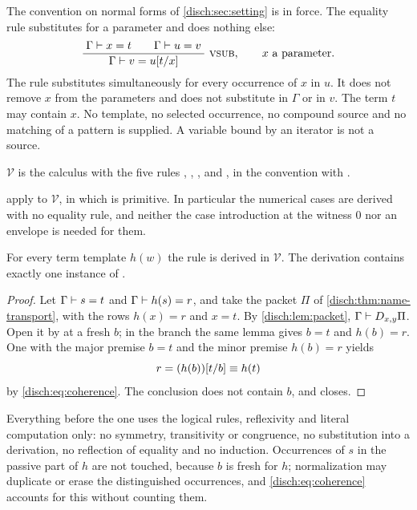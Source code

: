 The convention on normal forms of \cref{disch:sec:setting} is in force.
The equality rule substitutes for a parameter and does nothing else:
\begin{equation}
 \infrule{\Gamma\proves x=t\qquad\Gamma\proves u=v}
         {\Gamma\proves v=u\subst{t}{x}}\ \rulename{VSub},
 \qquad x\text{ a parameter.}
 \label{disch:eq:vsub}
\end{equation}
The rule substitutes simultaneously for every occurrence of $x$ in $u$. It
does not remove $x$ from the parameters and does not substitute in
$\Gamma$ or in $v$. The term $t$ may contain $x$. No template, no selected
occurrence, no compound source and no matching of a pattern is supplied.
A variable bound by an iterator is not a source.

\begin{definition}
\label{disch:def:vsub}
$\mathcal V$ is the calculus with the five rules ,
, ,  and , in
the convention with .
\end{definition}

 apply to
$\mathcal V$, in which  is primitive. In particular the
numerical cases are derived with no equality rule, and neither the case
introduction at the witness $0$ nor an envelope is needed for them.

\begin{theorem}
\label{disch:thm:vsub-transport}
For every term template $h(w)$ the rule  is derived in
$\mathcal V$. The derivation contains exactly one instance of
.
\end{theorem}

\begin{proof}
Let $\Gamma\vdash s=t$ and $\Gamma\vdash h(s)=r$, and take the packet
$\Pi$ of \cref{disch:thm:name-transport}, with the rows $h(x)=r$ and
$x=t$. By \cref{disch:lem:packet}, $\Gamma\vdash D_{x,y}\Pi$. Open it by
 at a fresh $b$; in the branch the same lemma gives
$b=t$ and $h(b)=r$. One  with the major premise $b=t$ and
the minor premise $h(b)=r$ yields
\[
 r=(h(b))[t/b]\equiv h(t)
\]
by \eqref{disch:eq:coherence}. The conclusion does not contain $b$, and
 closes.
\end{proof}

Everything before the one  uses the logical rules,
reflexivity and literal computation only: no symmetry, transitivity or
congruence, no substitution into a derivation, no reflection of equality
and no induction. Occurrences of $s$ in the passive part of $h$ are not
touched, because $b$ is fresh for $h$; normalization may duplicate or
erase the distinguished occurrences, and \eqref{disch:eq:coherence}
accounts for this without counting them.

